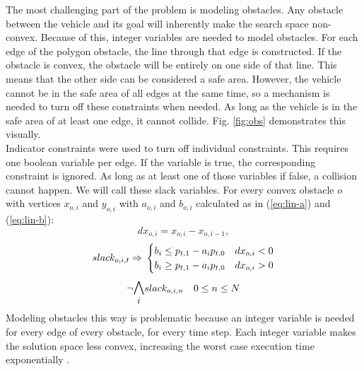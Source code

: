 The most challenging part of the problem is modeling obstacles. Any obstacle between the vehicle and its goal will inherently make the search space non-convex. Because of this, integer variables are needed to model obstacles. For each edge of the polygon obstacle, the line through that edge is constructed. If the obstacle is convex, the obstacle will be entirely on one side of that line. This means that the other side can be considered a safe area. However, the vehicle cannot be in the safe area of all edges at the same time, so a mechanism is needed to turn off these constraints when needed. As long as the vehicle is in the safe area of at least one edge, it cannot collide.  Fig. \ref{fig:obs} demonstrates this visually. \\
Indicator constraints were used to turn off individual constraints. This requires one boolean variable per edge. If the variable is true, the corresponding constraint is ignored. As long as at least one of those variables if false, a collision cannot happen. We will call these slack variables. For every convex obstacle $o$ with vertices $x_{o,i}$ and $y_{o,i}$ with $a_{o,i}$ and $b_{o,i}$ calculated as in (\ref{eq:lin-a}) and (\ref{eq:lin-b}):
\begin{equation*}
dx_{o,i} = x_{o,i} - x_{o,i-1},
\end{equation*}
\begin{equation}
\label{eq:obs}
slack_{o,i,t} \Rightarrow \\
\begin{cases}
b_i \leq p_{t,1} - a_i p_{t,0} & dx_{o,i} < 0 \\
b_i \geq p_{t,1} - a_i p_{t,0} & dx_{o,i} > 0 \\
\end{cases}
\end{equation}
\begin{equation}
\neg \mathlarger{\mathlarger{\bigwedge_{i}}} slack_{o,i,n} \quad 0 \leq n \leq N
\end{equation}
Modeling obstacles this way is problematic because an integer variable is needed for every edge of every obstacle, for every time step. Each integer variable makes the solution space less convex, increasing the worst case execution time exponentially \cite{DBLP:conf/coco/Karp72}.
